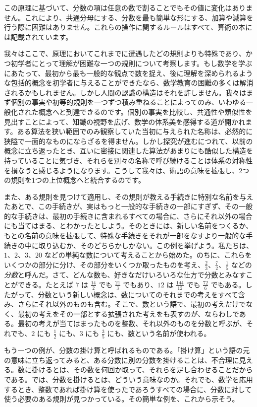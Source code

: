 \documentclass[a4paper,11pt,openany]{ltjsbook}
\begin{document}
この原理に基づいて、分数の項は任意の数で割ることでもその値に変化はありません。これにより、共通分母にする、分数を最も簡単な形にする、加算や減算を行う際に困難はありません。これらの操作に関するルールはすべて、算術の本には記載されています。

我々はここで、原理においてこれまでに遭遇したどの規則よりも特殊であり、かつ初学者にとって理解が困難な一つの規則について考察します。もし数学を学ぶにあたって、最初から最も一般的な観点で数を捉え、後に理解を深められるような包括的概念を初学者に与えることができたなら、数学教育の困難の多くは解消されるかもしれません。しかし人間の認識の構造はそれを許しません。我々はまず個別の事実や初等的規則を一つずつ積み重ねることによってのみ、いわゆる一般化された概念へと到達できるのです。個別の事実を比較し、共通性や類似性を見出すことによって、知識の視野を広げ、数学の体系美を感得する道が開かれます。ある算法を狭い範囲でのみ観察していた当初に与えられた名称は、必然的に狭隘で一面的なものにならざるを得ません。しかし探究が進むにつれて、以前の概念に立ち返ったとき、互いに密接に関連した算法があまりにも酷似した構造を持っていることに気づき、それらを別々の名称で呼び続けることは体系の対称性を損なうと感じるようになります。こうして我々は、術語の意味を拡張し、2つの規則を1つの上位概念へと統合するのです。

また、ある規則を見つけて適用し、その規則が教える手続きに特別な名前を与えたあとで、この手続きが、実はもっと一般的な手続きの一部にすぎず、その一般的な手続きは、最初の手続きに含まれるすべての場合に、さらにそれ以外の場合にも当てはまる、とわかったとしよう。そのときには、新しい名前をつくるか、もとの名前の意味を拡張して、特殊な手続きをそれが一部をなすより一般的な手続きの中に取り込むか、そのどちらかしかない。この例を挙げよう。私たちは、$1$、$2$、$3$、$20$ などの単純な数について考えることから始めた。のちに、これらをいくつかの部分に分け、その部分をいくつか取ったものを考え、$\frac{2}{3}$、$\frac{7}{2}$、$\frac{1}{5}$ などの\emph{分数}と呼んだ。さて、どんな数も、好きなだけいろいろな仕方で分数とみなすことができる。たとえば $7$ は $\frac{14}{2}$ でも $\frac{21}{3}$ でもあり、$12$ は $\frac{144}{12}$ でも $\frac{72}{6}$ でもある。したがって、分数という新しい概念は、数についてのそれまでの考えをすべて含み、さらにそれ以外のものも含む。そこで、数という語で、最初の考えだけでなく、最初の考えをその一部とする拡張された考えをも表すのが、ならわしである。最初の考えが当てはまったものを整数、それ以外のものを分数と呼ぶが、それでも、$2$ にも $\frac{1}{2}$ にも、$3$ にも $\frac{3}{5}$ にも、数という名前が使われる。

もう一つの例が、分数の掛け算と呼ばれるものである。「掛け算」という語の元の意味に立ち返ってみると、ある分数に別の分数を掛けることは、不合理に見える。数に掛けるとは、その数を何回か取って、それらを足し合わせることだからである。では、分数を掛けるとは、どういう意味なのか。それでも、数学を応用するとき、整数であれば掛け算を使ったであろうすべての場合に、分数に対して使う必要のある規則が見つかっている。その簡単な例を、これから示そう。
\end{document}

